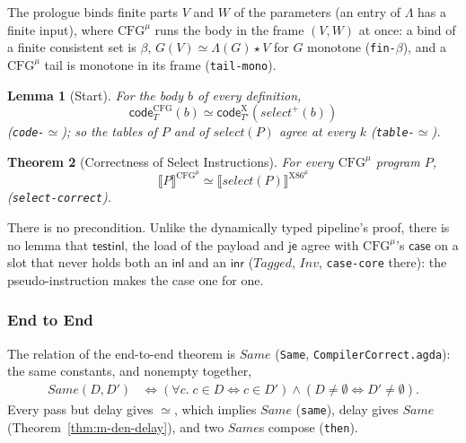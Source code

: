 \documentclass[10pt]{article}
\theoremstyle{acmplain}
\newtheorem{theorem}{Theorem}[section]
\newtheorem{lemma}[theorem]{Lemma}
\newcommand{\SEM}[1]{\llbracket #1 \rrbracket}
\newcommand{\key}[1]{\mathsf{#1}}
\newcommand{\pass}[1]{\mathit{#1}}
\newcommand{\app}{\star}
\newcommand{\NE}{\neq\emptyset}
\newcommand{\Same}{\mathit{Same}}
\newcommand{\Ml}[1]{\textrm{#1}^{\mu}}                  %
\begin{document}
The prologue binds finite parts $V$ and $W$ of the parameters (an entry
of $\Lambda$ has a finite input), where $\Ml{CFG}$ runs the body in the
frame $(V, W)$ at once: a bind of a finite consistent set is $\beta$,
$G(V) \simeq \Lambda(G) \app V$ for $G$ monotone (\texttt{fin-$\beta$}),
and a $\Ml{CFG}$ tail is monotone in its frame (\texttt{tail-mono}).
\begin{lemma}[Start]\label{lem:m-den-sel-start}
For the body $b$ of every definition,
\[ \key{code}^{\mathrm{CFG}}_{T}(b) \simeq \key{code}^{\mathrm{X}}_{T'}(\pass{select}^{+}(b)) \]
(\texttt{code-$\simeq$}); so the tables of $P$ and of $\pass{select}(P)$ agree at
every $k$ (\texttt{table-$\simeq$}).
\end{lemma}
\begin{theorem}[Correctness of Select Instructions]\label{thm:m-den-select}
For every $\Ml{CFG}$ program $P$,
\[ \SEM{P}^{\Ml{CFG}} \simeq \SEM{\pass{select}(P)}^{\Ml{X86}} \]
(\texttt{select-correct}).
\end{theorem}
There is no precondition. Unlike the dynamically typed pipeline's proof,
there is no lemma that $\key{testinl}$, the load of the payload and
$\key{je}$ agree with $\Ml{CFG}$'s $\key{case}$ on a slot that never holds
both an $\key{inl}$ and an $\key{inr}$ ($\mathit{Tagged}$, $\mathit{Inv}$,
\texttt{case-core} there): the pseudo-instruction makes the case one for
one.

\subsubsection{End to End}

The relation of the end-to-end theorem is $\Same$ (\texttt{Same},
\texttt{CompilerCorrect.agda}): the same constants, and nonempty
together,
\begin{align*}
  \Same(D, D') &\iff (\forall c.\; c \in D \iff c \in D') \land (D \NE \iff D' \NE) .
\end{align*}
Every pass but delay gives $\simeq$, which implies $\Same$
(\texttt{same}), delay gives $\Same$ (Theorem~\ref{thm:m-den-delay}), and
two $\Same$s compose (\texttt{then}).
\end{document}
